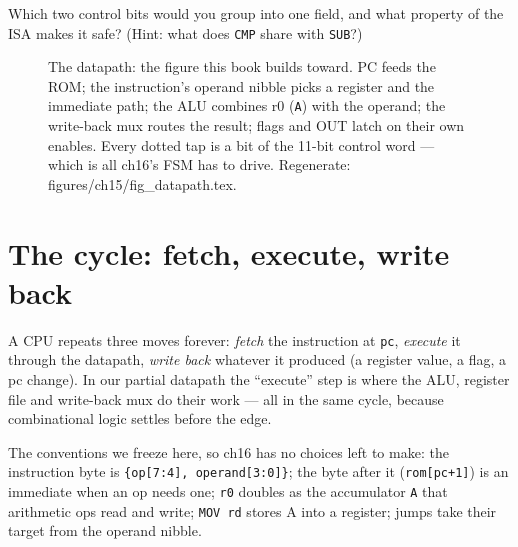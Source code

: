 \begin{exercise}[easy]
Which two control bits would you group into one field, and what
property of the ISA makes it safe? (Hint: what does \texttt{CMP}
share with \texttt{SUB}?)
\end{exercise}

\begin{figure}[htbp]
\centering

\caption{The datapath: the figure this book builds toward. PC feeds
the ROM; the instruction's operand nibble picks a register and the
immediate path; the ALU combines r0 (\texttt{A}) with the operand;
the write-back mux routes the result; flags and OUT latch on their
own enables. Every dotted tap is a bit of the 11-bit control word ---
which is all ch16's FSM has to drive. Regenerate: \ttfamily
figures/ch15/fig\_datapath.tex.}
\label{fig:datapath15}
\end{figure}

\section{The cycle: fetch, execute, write back}\label{sec:cycle15}

A CPU repeats three moves forever: \emph{fetch} the instruction at
\texttt{pc}, \emph{execute} it through the datapath, \emph{write back}
whatever it produced (a register value, a flag, a pc change). In our
partial datapath the ``execute'' step is where the ALU, register file
and write-back mux do their work --- all in the same cycle, because
combinational logic settles before the edge.

The conventions we freeze here, so ch16 has no choices left to make:
the instruction byte is \texttt{\{op[7:4], operand[3:0]\}}; the byte
after it (\texttt{rom[pc+1]}) is an immediate when an op needs one;
\texttt{r0} doubles as the accumulator \texttt{A} that arithmetic ops
read and write; \texttt{MOV rd} stores A into a register; jumps take
their target from the operand nibble.

